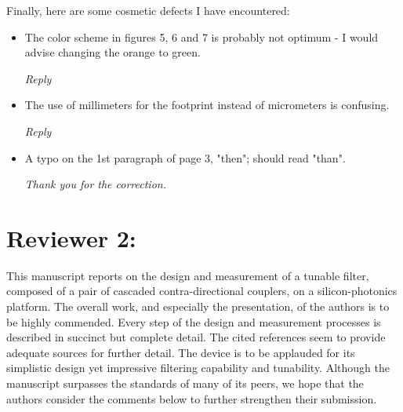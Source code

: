 \documentclass[]{article}
\begin{document}
Finally, here are some cosmetic defects I have encountered:
\begin{itemize}
\item The color scheme in figures 5, 6 and 7 is probably not optimum - I would advise changing the orange to green.

\emph{Reply}

\item The use of millimeters for the footprint instead of micrometers is confusing.

\emph{Reply}

\item A typo on the 1st paragraph of page 3, "then"; should read "than".

\emph{Thank you for the correction.}

\end{itemize}


\section{Reviewer 2:}
This manuscript reports on the design and measurement of a tunable filter, composed of a pair of cascaded contra-directional couplers, on a silicon-photonics platform. The overall work, and especially the presentation, of the authors is to be highly commended. Every step of the design and measurement processes is described in succinct but complete detail. The cited references seem to provide adequate sources for further detail. The device is to be applauded for its simplistic design yet impressive filtering capability and tunability. Although the manuscript surpasses the standards of many of its peers, we hope that the authors consider the comments below to further strengthen their submission.
\end{document}

